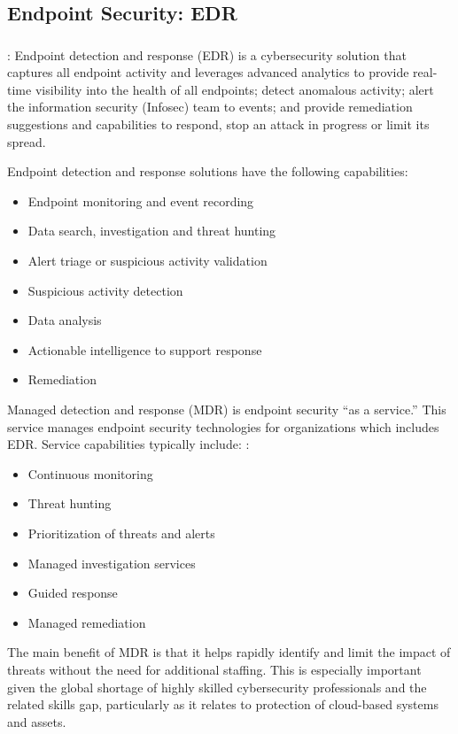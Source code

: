 \documentclass{article}
\begin{document}
\subsection{Endpoint Security: EDR}

\subsubsection{\textcite{Hayes:2023}}
\textbf{}:  Endpoint detection and response (EDR) is a cybersecurity solution that captures all endpoint activity and leverages advanced analytics to provide real-time visibility into the health of all endpoints; detect anomalous activity; alert the information security (Infosec) team to events; and provide remediation suggestions and capabilities to respond, stop an attack in progress or limit its spread.

Endpoint detection and response solutions have the following capabilities:

\begin{itemize}
\item	Endpoint monitoring and event recording
\item	Data search, investigation and threat hunting
\item	Alert triage or suspicious activity validation
\item	Suspicious activity detection
\item	Data analysis
\item	Actionable intelligence to support response
\item	Remediation
\end{itemize}

Managed detection and response (MDR) is endpoint security “as a service.” This  service manages endpoint security technologies for organizations which includes EDR. Service capabilities typically include: :

\begin{itemize}
\item	Continuous monitoring
\item	Threat hunting
\item	Prioritization of threats and alerts
\item	Managed investigation services
\item	Guided response
\item	Managed remediation
\end{itemize}

The main benefit of MDR is that it helps rapidly identify and limit the impact of threats without the need for additional staffing. This is especially important given the global shortage of highly skilled cybersecurity professionals and the related skills gap, particularly as it relates to protection of cloud-based systems and assets.
\end{document}
